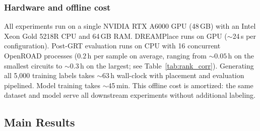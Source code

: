 \documentclass[sigconf,anonymous,review,9pt]{acmart}
\begin{document}
\subsubsection{Hardware and offline cost}
All experiments run on a single NVIDIA RTX A6000 GPU (48\,GB) with an
Intel Xeon Gold 5218R CPU and 64\,GB RAM. DREAMPlace runs on GPU
(${\sim}$24\,s per configuration). Post-GRT evaluation runs on CPU
with 16 concurrent OpenROAD processes
($0.2$\,h per sample on average, ranging from ${\sim}0.05$\,h on the
smallest circuits to ${\sim}0.3$\,h on the largest; see
Table~\ref{tab:rank_corr}). Generating all 5{,}000 training labels
takes ${\sim}$63\,h wall-clock with placement and evaluation
pipelined. Model training takes ${\sim}$45\,min. This offline cost is
amortized: the same dataset and model serve all downstream experiments
without additional labeling.


\subsection{Main Results}
\label{subsec:main_results}
\end{document}
